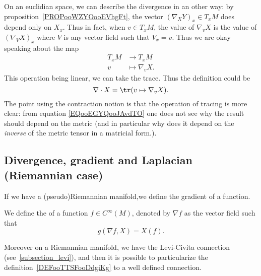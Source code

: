 On an euclidian space, we can describe the divergence in an other way: by proposition~\ref{PROPooWZYOooEVhgFt}, the vector \( (\nabla_XY)_x\in T_xM \) does depend only on \( X_x\). Thus in fact, when \( v\in T_xM\), the value of \( \nabla_vX\) is the value of \( (\nabla_VX)_{x}\) where \( V\) is any vector field such that \( V_x=v\). Thus we are okay speaking about the map
\begin{equation}
	\begin{aligned}
		T_xM & \to T_xM           \\
		v    & \mapsto \nabla_vX.
	\end{aligned}
\end{equation}
This operation being linear, we can take the trace. Thus the definition could be
\begin{equation}    \label{EQooEGYQooJAvdTO}
	\nabla\cdot X=\tr(v\mapsto \nabla_vX).
\end{equation}
The point using the contraction notion is that the operation of tracing is more clear: from equation \eqref{EQooEGYQooJAvdTO} one does not see why the result should depend on the metric (and in particular why does it depend on the \emph{inverse} of the metric tensor in a matricial form.).

\subsection{Divergence, gradient and Laplacian (Riemannian case)}

If we have a (pseudo)Riemannian manifold,we define the gradient of a function.
\begin{definition}
	We define the  of a function $f\in C^{\infty}(M)$, denoted by $\nabla f$ as the vector field such that
	\begin{equation}        \label{EQooECZSooYfQFYm}
		g(\nabla f,X)=X(f).
	\end{equation}
\end{definition}

Moreover on a Riemannian manifold, we have the Levi-Civita connection (see~\ref{subsection_levi}), and then it is possible to particularize the definition~\ref{DEFooTTSFooDdgiKg} to a well defined connection.

